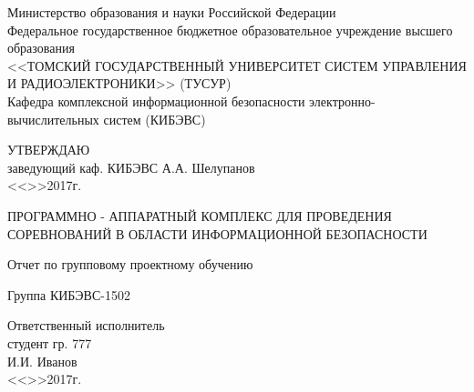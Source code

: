 \begin{titlepage}

\begin{center}
 Министерство образования и науки Российской Федерации\\
 Федеральное государственное бюджетное образовательное учреждение высшего образования\\
 <<ТОМСКИЙ ГОСУДАРСТВЕННЫЙ УНИВЕРСИТЕТ СИСТЕМ УПРАВЛЕНИЯ И РАДИОЭЛЕКТРОНИКИ>> (ТУСУР)\\
 Кафедра комплексной информационной безопасности электронно-вычислительных систем (КИБЭВС)\\
\end{center}

\vfill

\begin{flushright}
\begin{minipage}{0.45\textwidth}
 \begin{flushleft}
  УТВЕРЖДАЮ\\
  заведующий каф. КИБЭВС
  \underline{\hspace{3cm}}А.А. Шелупанов \\
  <<\underline{\hspace{1cm}}>>\underline{\hspace{3cm}}2017г.\\
 \end{flushleft}
\end{minipage}
\end{flushright}

\vfill

\begin{center}
ПРОГРАММНО - АППАРАТНЫЙ КОМПЛЕКС ДЛЯ ПРОВЕДЕНИЯ СОРЕВНОВАНИЙ В ОБЛАСТИ ИНФОРМАЦИОННОЙ БЕЗОПАСНОСТИ

Отчет по групповому проектному обучению

Группа КИБЭВС-1502
\end{center}

\vfill
\begin{flushright}
\begin{minipage}{0.45\textwidth}
 \begin{flushleft}
  Ответственный исполнитель \\
  студент гр. 777 \\
  \underline{\hspace{3cm}}И.И. Иванов \\
  <<\underline{\hspace{1cm}}>>\underline{\hspace{3cm}}2017г.\\
 \end{flushleft}
\end{minipage}
\end{flushright}


\end{titlepage}
